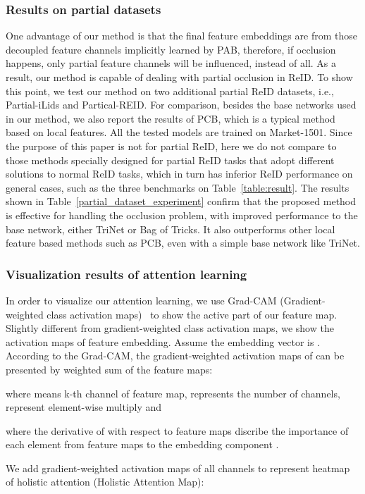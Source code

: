 \documentclass[10pt,twocolumn,letterpaper]{article}
\begin{document}
\subsubsection{Results on partial datasets} One advantage of our method is that the final feature embeddings are from those decoupled feature channels implicitly learned by PAB, therefore, if occlusion happens, only partial feature channels will be influenced, instead of all. As a result, our method is capable of dealing with partial occlusion in ReID. To show this point, we test our method on two additional partial ReID datasets, i.e., Partial-iLids and Partical-REID. For comparison, besides the base networks used in our method, we also report the results of PCB, which is a typical method based on local features. All the tested models are trained on Market-1501. Since the purpose of this paper is not for partial ReID, here we do not compare to those methods specially designed for partial ReID tasks that adopt different solutions to normal ReID tasks, which in turn has inferior ReID performance on general cases, such as the three benchmarks on Table~\ref{table:result}. The results shown in Table~\ref{partial_dataset_experiment} confirm that the proposed method is effective for handling the occlusion problem, with improved performance to the base network, either TriNet or Bag of Tricks. It also outperforms other local feature based methods such as PCB, even with a simple base network like TriNet.

\subsubsection{Visualization results of attention learning}
In order to visualize our attention learning, we use Grad-CAM (Gradient-weighted class activation maps)~\cite{selvaraju2017grad} to show the active part of our feature map. Slightly different from gradient-weighted class activation maps, we show the activation maps of feature embedding. Assume the embedding vector is . According to the Grad-CAM\cite{selvaraju2017grad}, the gradient-weighted activation maps of  can be presented by weighted sum of the feature maps:


where  means k-th channel of feature map,  represents the number of channels,  represent element-wise multiply and 


where the derivative of  with respect to feature maps discribe the importance of each element from feature maps to the embedding component . 

We add gradient-weighted activation maps of all channels to represent heatmap of holistic attention (Holistic Attention Map):
\end{document}
